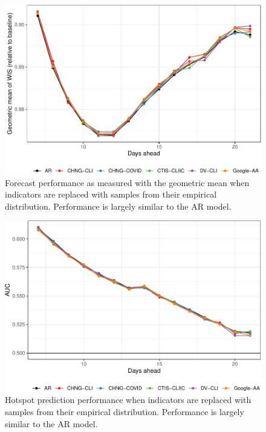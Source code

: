 \documentclass[9pt,twoside,lineno]{pnas-new}
\begin{document}
\clearpage

\begin{figure}

{\centering \includegraphics[width=\textwidth]{fig/fcast-booted-adjusted-1} 

}

\caption{Forecast performance as measured with the geometric mean when indicators are replaced with samples from their empirical distribution. Performance is largely similar to the AR model.}\label{fig:fcast-booted-adjusted}
\end{figure}

\clearpage

\begin{figure}

{\centering \includegraphics[width=\textwidth]{fig/hot-booted-1} 

}

\caption{Hotspot prediction performance when indicators are replaced with samples from their empirical distribution. Performance is largely similar to the AR model.}\label{fig:hot-booted}
\end{figure}
\end{document}
